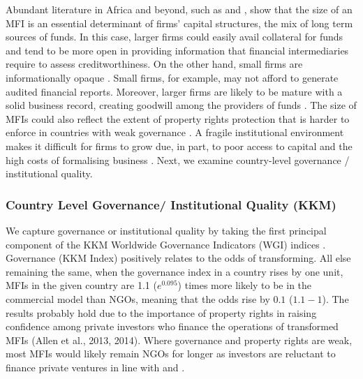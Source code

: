 \documentclass[a4paper,nobind]{templates/ociamthesis}
\begin{document}
Abundant literature in Africa and beyond, such as \textcite{gwatidzo2009corporate} and \textcite{kodongo2015capital}, show that the size of an MFI is an essential determinant of firms' capital structures, the mix of long term sources of funds. In this case, larger firms could easily avail collateral for funds and tend to be more open in providing information that financial intermediaries require to assess creditworthiness. On the other hand, small firms are informationally opaque \autocite{beck2014sme,kersten2017small}. Small firms, for example, may not afford to generate audited financial reports. Moreover, larger firms are likely to be mature with a solid business record, creating goodwill among the providers of funds \autocite{beck2008finance}. The size of MFIs could also reflect the extent of property rights protection that is harder to enforce in countries with weak governance \autocite{johnson2002property,claessens2003financial}. A fragile institutional environment makes it difficult for firms to grow due, in part, to poor access to capital and the high costs of formalising business \autocite{hansen2004reconsidering}. Next, we examine country-level governance / institutional quality.

\hypertarget{country-level-governance-institutional-quality-kkm}{%
\subsubsection{Country Level Governance/ Institutional Quality (KKM)}\label{country-level-governance-institutional-quality-kkm}}

We capture governance or institutional quality by taking the first principal component of the KKM Worldwide Governance Indicators (WGI) indices \autocite{kraay2010worldwide}. Governance (KKM Index) positively relates to the odds of transforming. All else remaining the same, when the governance index in a country rises by one unit, MFIs in the given country are 1.1 (\(e^{0.095}\)) times more likely to be in the commercial model than NGOs, meaning that the odds rise by \(0.1\) (\(1.1 - 1\)). The results probably hold due to the importance of property rights in raising confidence among private investors who finance the operations of transformed MFIs (Allen et al., 2013, 2014). Where governance and property rights are weak, most MFIs would likely remain NGOs for longer as investors are reluctant to finance private ventures in line with \textcite{johnson2002property} and \textcite{claessens2003financial}.
\end{document}
